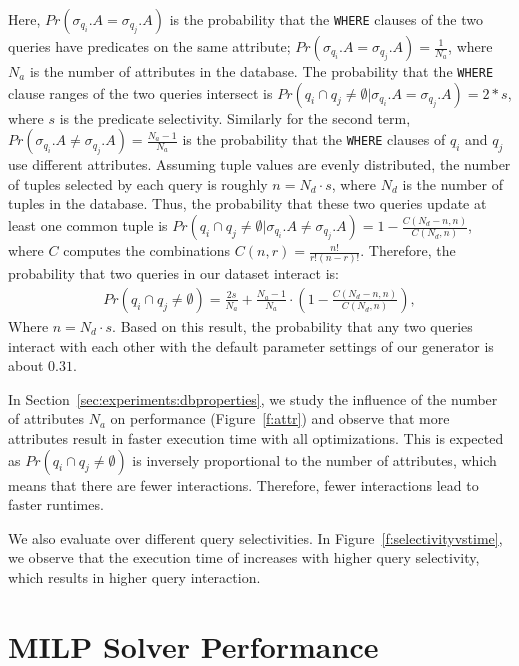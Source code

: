 Here, $Pr(\sigma_{q_i}.A= \sigma_{q_j}.A)$ is the probability that the
\texttt{WHERE} clauses of the two queries have predicates on the same
attribute; $Pr(\sigma_{q_i}.A= \sigma_{q_j}.A)=\frac{1}{N_a}$, where $N_a$ is
the number of attributes in the database. The probability that the
\texttt{WHERE} clause ranges of the two queries intersect is $Pr(q_i\cap q_j
\neq \emptyset |\sigma_{q_i}.A= \sigma_{q_j}.A) = 2*s$, where $s$ is the
predicate selectivity. Similarly for the second term, $Pr(\sigma_{q_i}.A\neq
\sigma_{q_j}.A) = \frac{N_a-1}{N_a}$ is the probability that the
\texttt{WHERE} clauses of $q_i$ and $q_j$ use different attributes. Assuming
tuple values are evenly distributed, the number of tuples selected by each
query is roughly $n = N_d \cdot s$, where $N_d$ is the number of tuples in the
database. Thus, the probability that these two queries update at least one
common tuple is $Pr(q_i\cap q_j \neq \emptyset |\sigma_{q_i}.A\neq
\sigma_{q_j}.A) = 1 - \frac{C(N_d - n, n)}{C(N_d, n)}$, where $C$ computes the
combinations $C(n,r) = \frac{n!}{r!(n-r)!}$. Therefore, the probability that
two queries in our dataset interact is:
\begin{multline} \label{eq:pr}
Pr(q_i\cap q_j \neq \emptyset) = \frac{2s}{N_a} + \frac{N_a-1}{N_a} \cdot (1 - \frac{C(N_d - n, n)}{C(N_d, n)}), 
\end{multline}
Where $n = N_d \cdot s$. Based on this result, the probability that any two
queries interact with each other with the default parameter settings of our
generator is about $0.31$.

In Section~\ref{sec:experiments:dbproperties}, we study the influence of the
number of attributes $N_a$ on \sys performance (Figure~\ref{f:attr}) and
observe that more attributes result in faster execution time with all
optimizations. This is expected as $Pr(q_i\cap q_j \neq \emptyset)$ is
inversely proportional to the number of attributes, which means that there are
fewer interactions. Therefore, fewer interactions lead to faster runtimes.

We also evaluate \sys over different query selectivities. In
Figure~\ref{f:selectivityvstime}, we observe that the execution time of \sys
increases with higher query selectivity, which results in higher query
interaction.



\iffalse


\section{MILP Solver Performance}
\label{app:solvtime}

